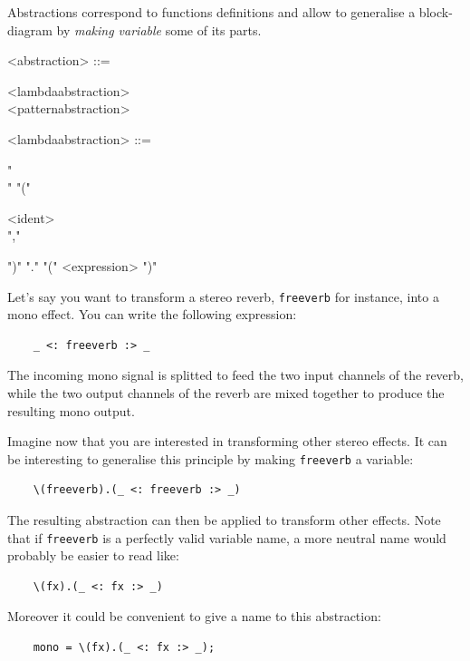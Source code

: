 \documentclass[a4paper]{book}
\begin{document}
Abstractions correspond to functions definitions and allow to generalise a block-diagram by \textit{making variable} some of its parts. 

\begin{grammar}
  <abstraction> ::= 
  \begin{syntdiag}
    \begin{stack}
      <lambdaabstraction> \\ <patternabstraction>
    \end{stack}
  \end{syntdiag}
\end{grammar}

\begin{grammar}
  <lambdaabstraction> ::= 
  \begin{syntdiag}
    "\\" "(" 
    \begin{rep}
      <ident> \\ ","
    \end{rep}
    ")" "." "(" <expression> ")"
  \end{syntdiag}
\end{grammar}

Let's say you want to transform a stereo reverb, \lstinline'freeverb' for instance, into a mono effect. You can write the following expression: 
\begin{lstlisting}
	_ <: freeverb :> _ 
\end{lstlisting}
The incoming mono signal is splitted to feed the two input channels of the reverb, while the two output channels of the reverb are mixed together to produce the resulting mono output.

Imagine now that you are interested in transforming other stereo effects. It can be interesting to generalise this principle by making \lstinline'freeverb' a variable: 
\begin{lstlisting}
	\(freeverb).(_ <: freeverb :> _)
\end{lstlisting}

The resulting abstraction can then be applied to transform other effects. Note that if \lstinline'freeverb' is a perfectly valid variable name, a more neutral name would probably be easier to read like:
\begin{lstlisting}
	\(fx).(_ <: fx :> _)
\end{lstlisting}
 
Moreover it could be convenient to give a name to this abstraction:
\begin{lstlisting}
	mono = \(fx).(_ <: fx :> _);
\end{lstlisting}
\end{document}
